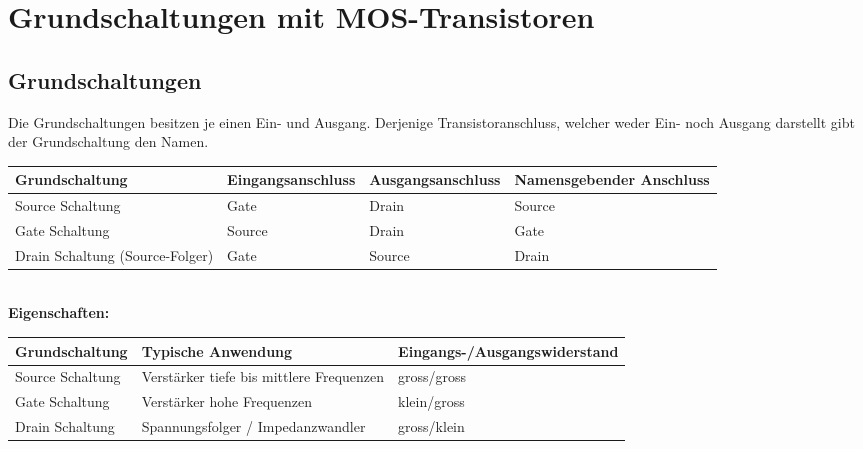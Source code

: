 \section{Grundschaltungen mit MOS-Transistoren}

\subsection{Grundschaltungen}
Die Grundschaltungen besitzen je einen Ein- und Ausgang. Derjenige Transistoranschluss, welcher weder Ein- noch Ausgang darstellt gibt der Grundschaltung
den Namen. \\

\begin{tabularx}{\linewidth}{|X|l|l|l|}
	\hline
	\textbf{Grundschaltung}	& \textbf{Eingangsanschluss} & \textbf{Ausgangsanschluss} & \textbf{Namensgebender Anschluss}
	\\ \hline
	Source Schaltung	& Gate				& Drain				& Source
	\\ \hline
	Gate Schaltung		& Source			& Drain				& Gate
	\\ \hline
	Drain Schaltung (Source-Folger) & Gate				& Source			& Drain 
	\\ \hline
\end{tabularx} \\

\textbf{Eigenschaften:} \\
\begin{tabularx}{\linewidth}{|X|l|l|}
	\hline
	\textbf{Grundschaltung} & \textbf{Typische Anwendung} & \textbf{Eingangs-/Ausgangswiderstand}
	\\ \hline
	Source Schaltung & Verstärker tiefe bis mittlere Frequenzen & gross/gross
	\\ \hline
	Gate Schaltung & Verstärker hohe Frequenzen & klein/gross
	\\ \hline
	Drain Schaltung & Spannungsfolger / Impedanzwandler & gross/klein
	\\ \hline
\end{tabularx}